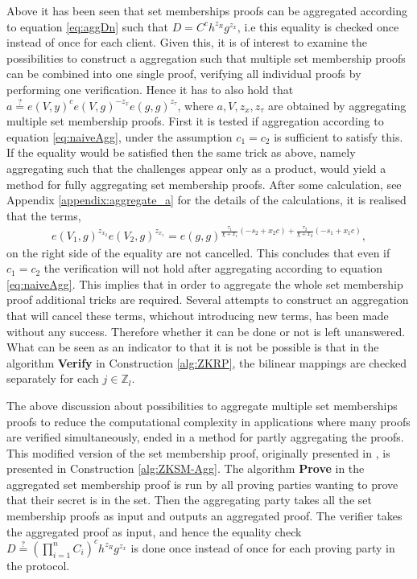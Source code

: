 Above it has been seen that set memberships proofs can be aggregated according to equation \eqref{eq:aggDn} such that $D=C^ch^{z_R}g^{z_x}$, i.e this equality is checked once instead of once for each client. Given this, it is of interest to examine the possibilities to construct a aggregation such that multiple set membership proofs can be combined into one single proof, verifying all individual proofs by performing one verification. Hence it has to also hold that  $a \overset{?}{=} e(V,y)^c e(V,g)^{-z_x}e(g,g)^{z_\tau}$, where $a,V,z_{x},z_\tau$  are obtained by aggregating multiple set membership proofs. First it is tested if aggregation according to equation \eqref{eq:naiveAgg}, under the assumption $c_1=c_2$ is sufficient to satisfy this. If the equality would be satisfied then the same trick as above, namely aggregating such that the challenges appear only as a product, would yield a method for fully aggregating set membership proofs.  After some calculation, see Appendix \ref{appendix:aggregate_a} for the details of the calculations, it is realised that the terms,
\begin{align*}
e(V_1,g)^{z_{x_2}}e(V_2,g)^{z_{x_1}} = e(g,g)^{\frac{\tau_1}{\chi + x_1}(-s_2+x_2c) +\frac{\tau_2}{\chi + x_2}(-s_1+x_1c)   } ,
\end{align*}
on the right side of the equality are not cancelled. This concludes that even if $c_1=c_2$ the verification will not hold after aggregating according to equation \eqref{eq:naiveAgg}. This implies that in order to aggregate the whole set membership proof additional tricks are required. Several attempts to construct an aggregation that will cancel these terms, whichout introducing new terms, has been made without any success. Therefore whether it can be done or not is left unanswered. What can be seen as an indicator to that it is not be possible is that in the algorithm \textbf{Verify} in Construction \ref{alg:ZKRP}, the bilinear mappings are checked separately for each $j\in\mathds{Z}_l$. 




The above discussion about possibilities to aggregate multiple set memberships proofs to reduce the computational complexity in applications where many proofs are verified simultaneously,  ended in a method for partly aggregating the proofs. This modified version of the set membership proof, originally presented in \cite{Efficient_proof_interval}, is presented in Construction \ref{alg:ZKSM-Agg}. The algorithm \textbf{Prove} in the aggregated set membership proof is run by all proving parties wanting to prove that their secret is in the set. Then the aggregating party takes all the set membership proofs as input and outputs an aggregated proof. The verifier takes the aggregated proof as input, and hence the equality check $D \overset{?}{=}( \prod_{i=1}^n C_i )^{c}h^{z_R}g^{z_x}$ is done once instead of once for each proving party in the protocol. 

